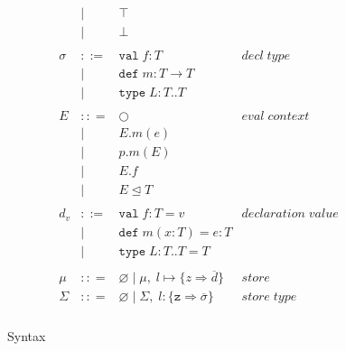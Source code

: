 \documentclass{llncs}
\numberwithin{subcase}{case}
\numberwithin{case}{theorem}
\numberwithin{case}{lemma}
\begin{document}
\begin{figure}[h]
\[\begin{array}{lll}
\begin{array}{lllr}
& | & \top & \\
& | & \bot & \\
&&\\
\sigma & ::= & \texttt{val} \; f:T & decl \; type\\
       & |   & \texttt{def} \; m:T \rightarrow T \\
		 & |   & \texttt{type} \; L : T .. T &\\
&&\\
E & :: = & \bigcirc & eval \; context\\
       & | & E.m(e)\\
       & | & p.m(E)\\
       & | & E.f\\
       & | & E \unlhd T\\
&&\\
d_v & ::= & \texttt{val} \; f : T = v & declaration \; value \\
  & |   & \texttt{def} \; m(x:T) = e : T &\\
  & |   & \texttt{type} \; L : T .. T = T &\\
&&\\
\mu & :: = & \varnothing \; | \; \mu,\; l \mapsto \{z \Rightarrow \overline{d}\} & store \\
\Sigma & :: = & \varnothing \; | \; \Sigma,\; l : \{\texttt{z} \Rightarrow \overline{\sigma}\} & store \; type \\
\end{array}
\end{array}
\]
\caption{Syntax}
\label{f:syntax}
\end{figure}
\end{document}
